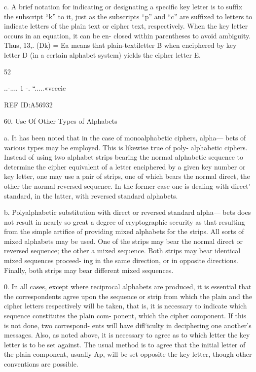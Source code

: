 {c. A brief notation for indicating or designating a speciﬁc key letter
is to sufﬁx the subscript “k” to it, just as the subscripts “p” and “c”
are sufﬁxed to letters to indicate letters of the plain text or cipher text,
respectively. When the key letter occurs in an equation, it can be en-
closed within parentheses to avoid ambiguity. Thus, 13,. (Dk) = Ea
means that plain-textiletter B when enciphered by key letter D (in a
certain alphabet system) yields the cipher letter E.

52

..-.... 1 -. “.....«veeeie

 

 

 

 

 

REF ID:A56932

60. Use Of Other Types of Alphabets

a. It has been noted that in the case of monoalphabetic ciphers, alpha—
bets of various types may be employed. This is likewise true of poly-
alphabetic ciphers. Instead of using two alphabet strips bearing the
normal alphabetic sequence to determine the cipher equivalent of a letter
enciphered by a given key number or key letter, one may use a pair of
strips, one of which bears the normal direct, the other the normal reversed
sequence. In the former case one is dealing with direct' standard, in the
latter, with reversed standard alphabets.

b. Polyalphabetic substitution with direct or reversed standard alpha—
bets does not result in nearly so great a degree of cryptographic security
as that resulting from the simple artiﬁce of providing mixed alphabets
for the strips. All sorts of mixed alphabets may be used. One of the
strips may bear the normal direct or reversed sequence; the other a
mixed sequence. Both strips may bear identical mixed sequences proceed-
ing in the same direction, or in opposite directions. Finally, both strips
may bear different mixed sequences.

0. In all cases, except where reciprocal alphabets are produced, it is
essential that the correspondents agree upon the sequence or strip from
which the plain and the cipher letters respectively will be taken, that is,
it is necessary to indicate which sequence constitutes the plain com-
ponent, which the cipher component. If this is not done, two correspond-
ents will have diﬂ‘iculty in deciphering one another’s messages. Also, as
noted above, it is necessary to agree as to which letter the key letter is to
be set against. The usual method is to agree that the initial letter of the
plain component, usually Ap, will be set opposite the key letter, though
other conventions are possible.

}
